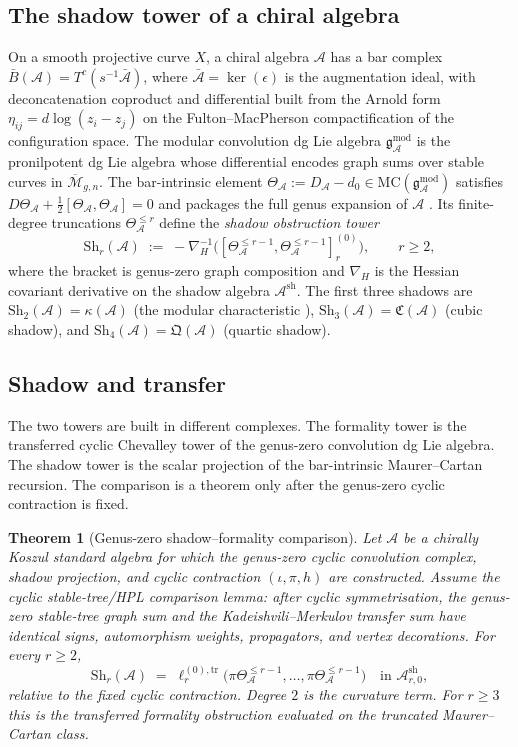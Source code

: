\documentclass[11pt,reqno]{amsart}
\newtheorem{theorem}{Theorem}[section]
\theoremstyle{definition}
\theoremstyle{remark}
\providecommand{\cA}{\mathcal{A}}
\providecommand{\cM}{\mathcal{M}}
\providecommand{\barB}{\bar{B}}
\providecommand{\MC}{\mathrm{MC}}
\providecommand{\gmod}{\mathfrak{g}^{\mathrm{mod}}_{\cA}}
\providecommand{\Sh}{\mathrm{Sh}}
\providecommand{\Ash}{\cA^{\mathrm{sh}}}
\numberwithin{equation}{section}
\begin{document}
\subsection{The shadow tower of a chiral algebra}

On a smooth projective curve $X$, a chiral algebra $\cA$
\cite{BD04} has a bar complex
$\barB(\cA)=T^c(s^{-1}\bar{\cA})$, where $\bar{\cA}=\ker(\epsilon)$
is the augmentation ideal, with deconcatenation coproduct and
differential built from the Arnold form
$\eta_{ij}=d\log(z_i-z_j)$ on the Fulton--MacPherson
compactification of the configuration space. The modular
convolution dg Lie algebra $\gmod$ is the pronilpotent dg Lie
algebra whose differential encodes graph sums over stable
curves in $\overline{\cM}_{g,n}$. The bar-intrinsic element
$\Theta_{\cA}:=D_{\cA}-d_0\in\MC(\gmod)$ satisfies
$D\Theta_{\cA}+\tfrac12[\Theta_{\cA},\Theta_{\cA}]=0$ and
packages the full genus expansion of $\cA$
\cite[MC2 and modular convolution theorem]{Lorgat26}. Its finite-degree truncations
$\Theta^{\le r}_{\cA}$ define the \emph{shadow obstruction
tower}
\[
\Sh_r(\cA)\;:=\;-\nabla_H^{-1}\bigl([\Theta^{\le r-1}_{\cA},
\Theta^{\le r-1}_{\cA}]_r^{(0)}\bigr),
\qquad r\ge 2,
\]
where the bracket is genus-zero graph composition and
$\nabla_H$ is the Hessian covariant derivative on the shadow
algebra $\Ash$. The first three shadows are
$\Sh_2(\cA)=\kappa(\cA)$ (the modular characteristic
\cite[Theorem~D]{Lorgat26}), $\Sh_3(\cA)=\mathfrak{C}(\cA)$
(cubic shadow), and $\Sh_4(\cA)=\mathfrak{Q}(\cA)$ (quartic
shadow).

\subsection{Shadow and transfer}

The two towers are built in different complexes. The formality tower
is the transferred cyclic Chevalley tower of the genus-zero
convolution dg Lie algebra. The shadow tower is the scalar projection
of the bar-intrinsic Maurer--Cartan recursion. The comparison is a
theorem only after the genus-zero cyclic contraction is fixed.

\begin{theorem}[Genus-zero shadow--formality comparison]
\label{thm:n6-shadow-formality-summary}
Let $\cA$ be a chirally Koszul standard algebra for which the
genus-zero cyclic convolution complex, shadow projection, and cyclic
contraction $(\iota,\pi,h)$ are constructed. Assume the cyclic
stable-tree/HPL comparison lemma: after cyclic symmetrisation, the
genus-zero stable-tree graph sum and the Kadeishvili--Merkulov
transfer sum have identical signs, automorphism weights,
propagators, and vertex decorations. For every $r\ge2$,
\[
\Sh_r(\cA)\;=\;\ell_r^{(0),\mathrm{tr}}
\bigl(\pi\Theta^{\le r-1}_{\cA},\ldots,
\pi\Theta^{\le r-1}_{\cA}\bigr)
\quad\text{in }\Ash_{r,0},
\]
relative to the fixed cyclic contraction. Degree $2$ is the
curvature term. For $r\ge3$ this is the transferred formality
obstruction evaluated on the truncated Maurer--Cartan class.
\end{theorem}
\end{document}
